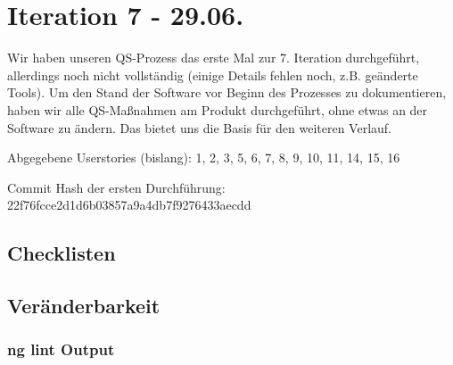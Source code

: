 \section*{Iteration 7 - 29.06.}
	Wir haben unseren QS-Prozess das erste Mal zur 7. Iteration durchgeführt, allerdings noch nicht vollständig (einige Details fehlen noch, z.B. geänderte Tools). Um den Stand der Software vor Beginn des Prozesses zu dokumentieren, haben wir alle QS-Maßnahmen am Produkt durchgeführt, ohne etwas an der Software zu ändern. Das bietet uns die Basis für den weiteren Verlauf.
	
	Abgegebene Userstories (bislang): 1, 2, 3, 5, 6, 7, 8, 9, 10, 11, 14, 15, 16
	
	Commit Hash der ersten Durchführung: 22f76fcce2d1d6b03857a9a4db7f9276433aecdd
	
	\subsection{Checklisten}
	
	
	
	
	
	
	
	
	
	
	\subsection{Veränderbarkeit}
	\subsubsection{ng lint Output}
	


